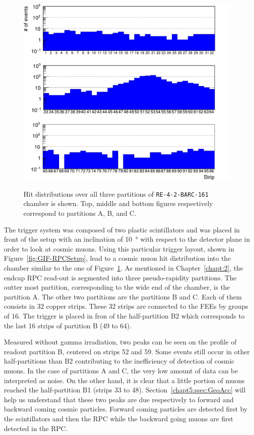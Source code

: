 	\begin{figure}
		\centering
		\includegraphics[width = \linewidth]{fig/chapt5/Data-21-profile.pdf}\\
		\caption{\label{fig:HitProf} Hit distributions over all three partitions of \texttt{RE-4-2-BARC-161} chamber is shown. Top, middle and bottom figures respectively correspond to partitions A, B, and C.}
	\end{figure}
	
	The trigger system was composed of two plastic scintillators and was placed in front of the setup with an inclination of \SI{10}{\degree} with respect to the detector plane in order to look at cosmic muons. Using this particular trigger layout, shown in Figure~\ref{fig:GIF-RPCSetup}, lead to a cosmic muon hit distribution into the chamber similar to the one of Figure~\ref{fig:HitProf}. As mentioned in Chapter~\ref{chapt:2}, the endcap RPC read-out is segmented into three pseudo-rapidity partitions. The outter most partition, corresponding to the wide end of the chamber, is the partition A. The other two partitions are the partitions B and C. Each of them consists in 32 copper strips. These 32 strips are connected to the FEEs by groups of 16. The trigger is placed in fron of the half-partition B2 which corresponds to the last 16 strips of partition B (49 to 64).
	
	Measured without gamma irradiation, two peaks can be seen on the profile of readout partition B, centered on strips 52 and 59. Some events still occur in other half-partitions than B2 contributing to the inefficiency of detection of cosmic muons. In the case of partitions A and C, the very low amount of data can be interpreted as noise. On the other hand, it is clear that a little portion of muons reached the half-partition B1 (strips 33 to 48). Section~\ref{chapt5:ssec:GeoAcc} will help us understand that these two peaks are due respectively to forward and backward coming cosmic particles. Forward coming particles are detected first by the scintillators and then the RPC while the backward going muons are first detected in the RPC.
	
